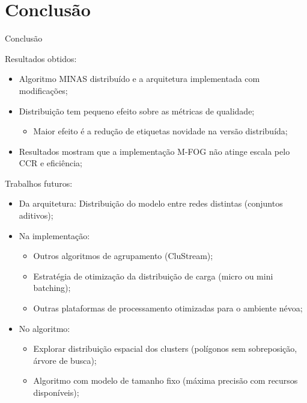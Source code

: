 \documentclass[aspectratio=1610,10pt]{beamer}
\newcommand{\mfog}{M-FOG\xspace}
\newcommand{\minas}{MINAS\xspace}
\begin{document}
\section{Conclusão}
\begin{frame}{Conclusão}
  
  \begin{alertblock}{Resultados obtidos:}
  \begin{itemize}
    \item Algoritmo \minas distribuído e a arquitetura \arch
    implementada com modificações;
    \item Distribuição tem pequeno efeito sobre as métricas de qualidade;
    \begin{itemize}
      \item Maior efeito é a redução de etiquetas novidade na versão distribuída;
    \end{itemize}
    \item Resultados mostram que a implementação \mfog não atinge escala pelo CCR e eficiência;
  \end{itemize}
  \end{alertblock}
  
  \vspace{.5em}
  \begin{alertblock}{Trabalhos futuros:}
  \begin{itemize}
    \item Da arquitetura: Distribuição do modelo entre redes distintas (conjuntos aditivos);
    \item Na implementação:
    \begin{itemize}
    \item Outros algoritmos de agrupamento (CluStream);
    \item Estratégia de otimização da distribuição de carga (micro ou mini batching);
    \item Outras plataformas de processamento otimizadas para o ambiente névoa;
    \end{itemize}
    \item No algoritmo:
    \begin{itemize}
    \item Explorar distribuição espacial dos clusters (polígonos sem
    sobreposição, árvore de busca);
    \item Algoritmo com modelo de tamanho fixo (máxima precisão com recursos disponíveis);
    \end{itemize}
  \end{itemize}
  \end{alertblock}
\end{frame}
\end{document}
